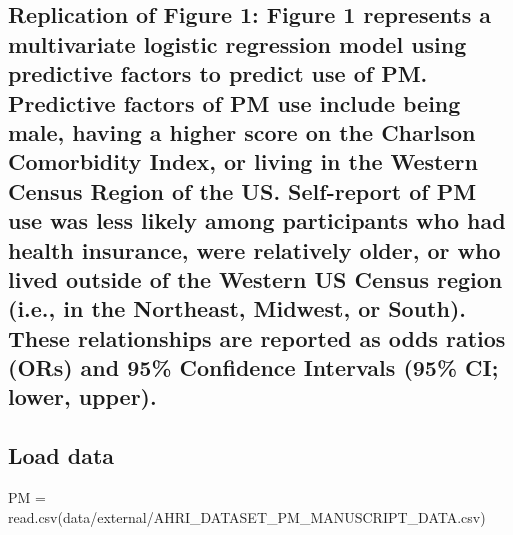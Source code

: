\documentclass[
]{article}
\newenvironment{Shaded}{\begin{snugshade}}{\end{snugshade}}
\newcommand{\FunctionTok}[1]{\textcolor[rgb]{0.00,0.00,0.00}{#1}}
\newcommand{\NormalTok}[1]{#1}
\newcommand{\OtherTok}[1]{\textcolor[rgb]{0.56,0.35,0.01}{#1}}
\newcommand{\StringTok}[1]{\textcolor[rgb]{0.31,0.60,0.02}{#1}}
\begin{document}
\hypertarget{replication-of-figure-1-figure-1-represents-a-multivariate-logistic-regression-model-using-predictive-factors-to-predict-use-of-pm.-predictive-factors-of-pm-use-include-being-male-having-a-higher-score-on-the-charlson-comorbidity-index-or-living-in-the-western-census-region-of-the-us.-self-report-of-pm-use-was-less-likely-among-participants-who-had-health-insurance-were-relatively-older-or-who-lived-outside-of-the-western-us-census-region-i.e.-in-the-northeast-midwest-or-south.-these-relationships-are-reported-as-odds-ratios-ors-and-95-confidence-intervals-95-ci-lower-upper.}{%
\subsection{Replication of Figure 1: Figure 1 represents a multivariate
logistic regression model using predictive factors to predict use of PM.
Predictive factors of PM use include being male, having a higher score
on the Charlson Comorbidity Index, or living in the Western Census
Region of the US. Self-report of PM use was less likely among
participants who had health insurance, were relatively older, or who
lived outside of the Western US Census region (i.e., in the Northeast,
Midwest, or South). These relationships are reported as odds ratios
(ORs) and 95\% Confidence Intervals (95\% CI; lower,
upper).}\label{replication-of-figure-1-figure-1-represents-a-multivariate-logistic-regression-model-using-predictive-factors-to-predict-use-of-pm.-predictive-factors-of-pm-use-include-being-male-having-a-higher-score-on-the-charlson-comorbidity-index-or-living-in-the-western-census-region-of-the-us.-self-report-of-pm-use-was-less-likely-among-participants-who-had-health-insurance-were-relatively-older-or-who-lived-outside-of-the-western-us-census-region-i.e.-in-the-northeast-midwest-or-south.-these-relationships-are-reported-as-odds-ratios-ors-and-95-confidence-intervals-95-ci-lower-upper.}}

\hypertarget{load-data}{%
\subsection{Load data}\label{load-data}}

\begin{Shaded}
\begin{Highlighting}[]
\NormalTok{PM }\OtherTok{=} \FunctionTok{read.csv}\NormalTok{(}\StringTok{\textquotesingle{}data/external/AHRI\_DATASET\_PM\_MANUSCRIPT\_DATA.csv\textquotesingle{}}\NormalTok{)}
\end{Highlighting}
\end{Shaded}
\end{document}
